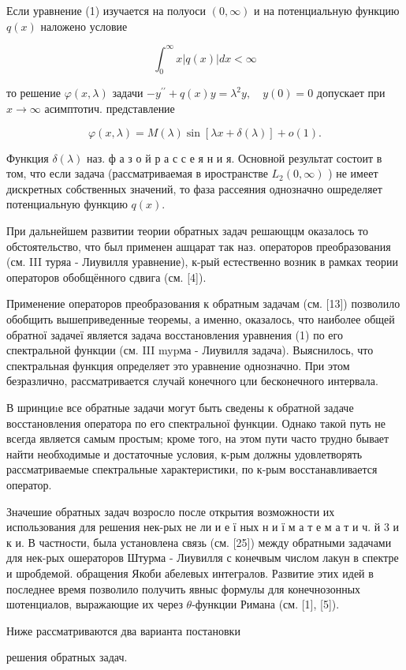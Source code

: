 \documentclass[10pt]{article}
\begin{document}
Если уравнение (1) изучается на полуоси $(0, \infty)$ и на потенциальную функцию $q(x)$ наложено условие



\[

\int_{0}^{\infty} x|q(x)| d x<\infty

\]



то решение $\varphi(x, \lambda)$ задачи $-y^{\prime \prime}+q(x) y=\lambda^{2} y, \quad y(0)=0$ допускает при $x \rightarrow \infty$ асимптотич. представление



\[

\varphi(x, \lambda)=M(\lambda) \sin [\lambda x+\delta(\lambda)]+o(1) .

\]



Функция $\delta(\lambda)$ наз. ф а з о й р а с с е я н и я. Основной результат состоит в том, что если задача (рассматриваемая в иространстве $L_{2}(0, \infty)$ ) не имеет дискретных собственных значений, то фаза рассеяния однозначно ошределяет потенциальную функцию $q(x)$.



При дальнейшем развитии теории обратных задач решающцм оказалось то обстоятельство, что был применен ашцарат так наз. операторов преобразования (см. III туряа - Лиувилля уравнение), к-рый естественно возник в рамках теории операторов обобщённого сдвига (см. [4]).



Применение операторов преобразования к обратным задачам (см. [13]) позволило обобщить вышеприведенные теоремы, а именно, оказалось, что наиболее общей обратної задачеї является задача восстановления уравнения (1) по его спектральной функции (см. III mypма - Лиувилля задача). Выяснилось, что спектральная функция определяет это уравнение однозначно. При этом безразлично, рассматривается случай конечного цли бесконечного интервала.



В шринциıе все обратные задачи могут быть сведены к обратной задаче восстановления оператора по его спектральної функции. Однако такоӥ путь не всегда является самым простым; кроме того, на этом пути часто трудно бывает найти необходимые и достаточные условия, к-рым должны удовлетворять рассматриваемые спектральные характеристики, по к-рым восстанавливается оператор.



Значешие обратных задач возросло после открытия возможности их использования для решения нек-рых не ли и е ї ных н и ї м а т е м а т и ч. й 3 и к и. В частности, была установлена связь (см. [25]) между обратными задачами для нек-рых ошераторов Штурма - Лиувилля с конечвым числом лакун в спектре и шробдемой. обращения Якоби абелевых интегралов. Развитие этих идей в последнее время позволило получить явныс формулы для конечнозонных шотенциалов, выражающие их через $\theta$-функции Римана (см. [1], [5]).



Ниже рассматриваются два варианта постановки

решения обратных задач.
\end{document}
